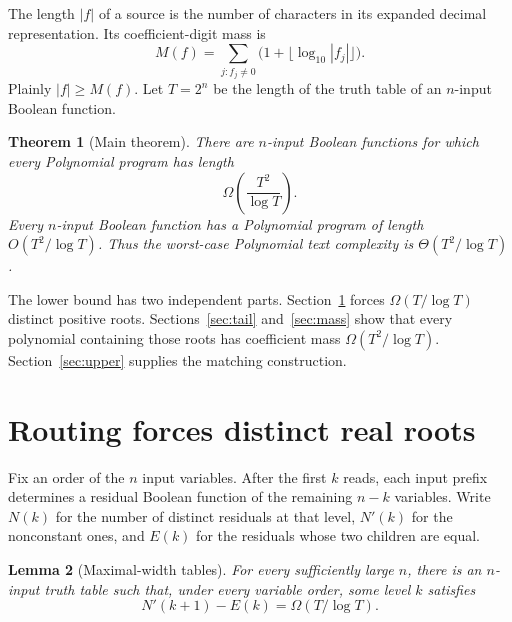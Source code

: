 \documentclass[11pt]{article}
\newtheorem{theorem}{Theorem}[section]
\newtheorem{lemma}[theorem]{Lemma}
\theoremstyle{definition}
\theoremstyle{remark}
\begin{document}
The length $|f|$ of a source is the number of characters in its expanded
decimal representation.  Its coefficient-digit mass is
\[
  M(f)=\sum_{j:f_j\ne0}\bigl(1+\lfloor\log_{10}|f_j|\rfloor\bigr).
\]
Plainly $|f|\ge M(f)$.  Let $T=2^n$ be the length of the truth table of an
$n$-input Boolean function.

\begin{theorem}[Main theorem]\label{thm:main}
There are $n$-input Boolean functions for which every Polynomial program has
length
\[
  \Omega\!\left(\frac{T^2}{\log T}\right).
\]
Every $n$-input Boolean function has a Polynomial program of length
$O(T^2/\log T)$.  Thus the worst-case Polynomial text complexity is
$\Theta(T^2/\log T)$.
\end{theorem}

The lower bound has two independent parts.  Section~\ref{sec:routing} forces
$\Omega(T/\log T)$ distinct positive roots.  Sections~\ref{sec:tail}
and~\ref{sec:mass} show that every polynomial containing those roots has
coefficient mass $\Omega(T^2/\log T)$.  Section~\ref{sec:upper} supplies the
matching construction.

\section{Routing forces distinct real roots}\label{sec:routing}

Fix an order of the $n$ input variables.  After the first $k$ reads, each
input prefix determines a residual Boolean function of the remaining
$n-k$ variables.  Write $N(k)$ for the number of distinct residuals at that
level, $N'(k)$ for the nonconstant ones, and $E(k)$ for the residuals whose
two children are equal.

\begin{lemma}[Maximal-width tables]\label{lem:maximal-width}
For every sufficiently large $n$, there is an $n$-input truth table such
that, under every variable order, some level $k$ satisfies
\begin{equation}\label{eq:residual-width}
  N'(k+1)-E(k)=\Omega(T/\log T).
\end{equation}
\end{lemma}
\end{document}
